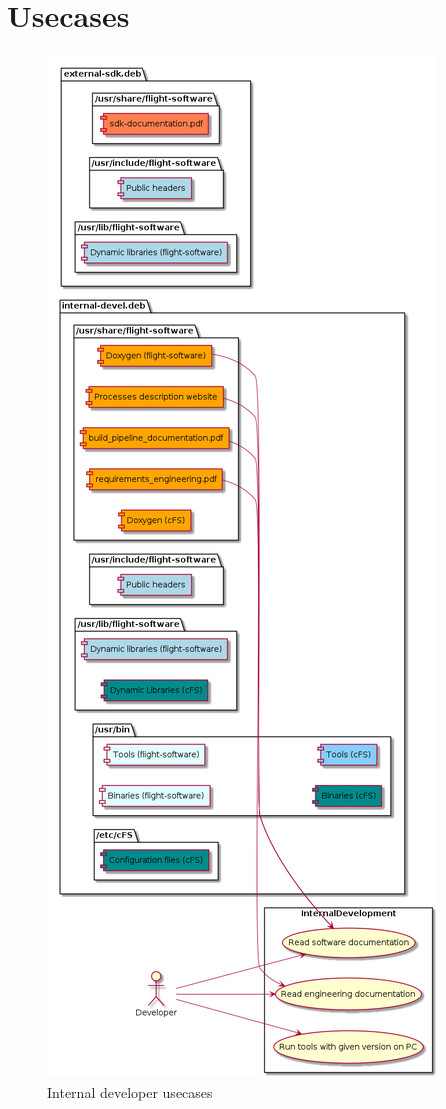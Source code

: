 \section{Usecases}
\begin{figure}[H]
    \centering
    \includegraphics[width=\textwidth,height=\textheight,keepaspectratio]{diagrams/usecases/internal_development.png}
    \caption{Internal developer usecases}
    \label{fig-internal-developer-usecases}
\end{figure}

